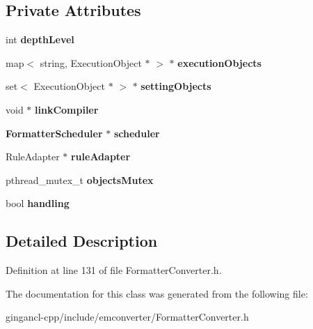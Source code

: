 \subsection*{Private Attributes}
\begin{CompactItemize}
\item 
int {\bf depthLevel}\label{classbr_1_1pucrio_1_1telemidia_1_1ginga_1_1ncl_1_1emconverter_1_1FormatterConverter_51e6397c8c34598d3476e7ce3c2b97df}

\item 
map$<$ string, ExecutionObject $\ast$ $>$ $\ast$ {\bf executionObjects}\label{classbr_1_1pucrio_1_1telemidia_1_1ginga_1_1ncl_1_1emconverter_1_1FormatterConverter_17505c7424ec3c69fb7edcde42d0f575}

\item 
set$<$ ExecutionObject $\ast$ $>$ $\ast$ {\bf settingObjects}\label{classbr_1_1pucrio_1_1telemidia_1_1ginga_1_1ncl_1_1emconverter_1_1FormatterConverter_7fde2cd7629692b40a67604b76177b4a}

\item 
void $\ast$ {\bf linkCompiler}\label{classbr_1_1pucrio_1_1telemidia_1_1ginga_1_1ncl_1_1emconverter_1_1FormatterConverter_cb3d6e0d031513761d98b82980040aeb}

\item 
{\bf FormatterScheduler} $\ast$ {\bf scheduler}\label{classbr_1_1pucrio_1_1telemidia_1_1ginga_1_1ncl_1_1emconverter_1_1FormatterConverter_fb7aae6c31924e21d6df13d25c5f2aad}

\item 
RuleAdapter $\ast$ {\bf ruleAdapter}\label{classbr_1_1pucrio_1_1telemidia_1_1ginga_1_1ncl_1_1emconverter_1_1FormatterConverter_50d33e558d7649f9855c50bfdafee9ff}

\item 
pthread\_\-mutex\_\-t {\bf objectsMutex}\label{classbr_1_1pucrio_1_1telemidia_1_1ginga_1_1ncl_1_1emconverter_1_1FormatterConverter_ef5575049c2fa98c56bb36d1c3e0a0b5}

\item 
bool {\bf handling}\label{classbr_1_1pucrio_1_1telemidia_1_1ginga_1_1ncl_1_1emconverter_1_1FormatterConverter_3d1feff49c5f556e3c4adb737126a9c3}

\end{CompactItemize}


\subsection{Detailed Description}




Definition at line 131 of file FormatterConverter.h.

The documentation for this class was generated from the following file:\begin{CompactItemize}
\item 
gingancl-cpp/include/emconverter/FormatterConverter.h\end{CompactItemize}

